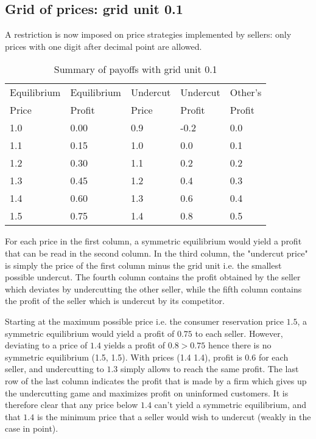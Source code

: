 \documentclass[11pt]{article}
\begin{document}
\subsection{Grid of prices: grid unit 0.1}

A restriction is now imposed on price strategies implemented by sellers: only prices with one digit after decimal point are allowed.

\begin{table}[h]
\caption{Summary of payoffs with grid unit 0.1}
\begin{singlespace}
\begin{tabular}{lllll}
   Equilibrium & Equilibrium & Undercut & Undercut & Other's  \\
   Price       & Profit      & Price    & Profit   & Profit   \\
   1.0         & 0.00        & 0.9      &-0.2      & 0.0      \\
   1.1         & 0.15        & 1.0      & 0.0      & 0.1      \\
   1.2         & 0.30        & 1.1      & 0.2      & 0.2      \\
   1.3         & 0.45        & 1.2      & 0.4      & 0.3      \\
   1.4         & 0.60        & 1.3      & 0.6      & 0.4      \\
   1.5         & 0.75        & 1.4      & 0.8      & 0.5      \\
\end{tabular}
\end{singlespace}
\end{table}

For each price in the first column, a symmetric equilibrium would yield a profit that can be read in the second column. In the third column, the "undercut price" is simply the price of the first column minus the grid unit i.e. the smallest possible undercut. The fourth column contains the profit obtained by the seller which deviates by undercutting the other seller, while the fifth column contains the profit of the seller which is undercut by its competitor.

Starting at the maximum possible price i.e. the consumer reservation price $1.5$, a symmetric equilibrium would yield a profit of $0.75$ to each seller. However, deviating to a price of $1.4$ yields a profit of $0.8 > 0.75$ hence there is no symmetric equilibrium (1.5, 1.5). With prices (1.4 1.4), profit is $0.6$ for each seller, and undercutting to $1.3$ simply allows to reach the same profit. The last row of the last column indicates the profit that is made by a firm which gives up the undercutting game and maximizes profit on uninformed customers. It is therefore clear that any price below $1.4$ can't yield a symmetric equilibrium, and that $1.4$ is the minimum price that a seller would wish to undercut (weakly in the case in point).
\end{document}
